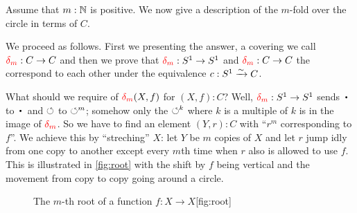 \begin{example}\label{exa:mfoldCcover}
Assume that $m:\mathbb{N}$ is positive.  We now give a description of 
the $m$-fold \covering over the circle in terms of $C$.

We proceed as follows.  First we presenting the answer, a covering we call $\dg{m}:C\to C$ and then we prove that $\dg{m}:S^1\to S^1$ and $\dg{m}:C\to C$ the  correspond to each other under the equivalence $c:S^1\xrightarrow{\sim} C$. 

 What should we require of $\dg{m}(X,f)$ for $(X,f):C$? Well, $\dg{m}:S^1\to S^1$ sends $\base$ to $\base$ and $\circlearrowleft$ to $\circlearrowleft^m$; somehow only the $\circlearrowleft^k$ where $k$ is a multiple of $k$ is in the image of $\dg{m}$.  So we have to find an element $(Y,r):C$ with ``$r^m$ corresponding to $f$''.  We achieve this by ``streching'' $X$: let $Y$ be $m$ copies of $X$ and let $r$ jump idly from one copy to another except every $m$th time when $r$ also is allowed to use $f$.  
This is illustrated in \cref{fig:root} with the shift by $f$ being 
vertical and the movement from copy to copy going around a circle.  
\begin{figure}[hbt]
  \begin{sidecaption}%
    {The $m$-th root of a function $f: X\to X$}[fig:root]
  \centering
  \end{sidecaption}
\end{figure}


\end{example}
